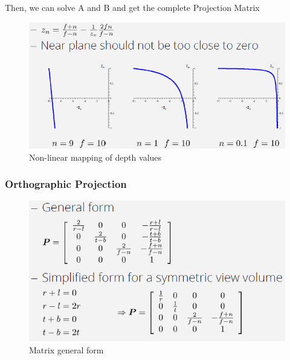 \documentclass{article}
\begin{document}
Then, we can solve A and B and get the complete Projection Matrix
\begin{figure}
\includegraphics[scale=0.6]{image44.png}
\caption{Non-linear mapping of depth values}
\end{figure}

\subsubsection{Orthographic Projection}
\begin{figure}
\includegraphics[scale=0.6]{image46.png}
\caption{Matrix general form}
\end{figure}
\end{document}
